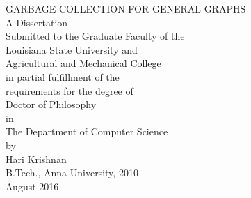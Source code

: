 \documentclass[12pt,letterpaper]{report}
\begin{document}

\thispagestyle{empty}
	\begin{center}
	\vspace*{0.5in}
	\Large{GARBAGE COLLECTION FOR GENERAL GRAPHS}\\
	\vspace{2in}
	\normalsize{A Dissertation\\}
	\vspace{\baselineskip}
	\normalsize{Submitted to the Graduate Faculty of the\\}
        \normalsize{Louisiana State University and\\}
        \normalsize{Agricultural and Mechanical College\\}
	\normalsize{in partial fulfillment of the\\}
        \normalsize{requirements for the degree of\\}
        \normalsize{Doctor of Philosophy\\}
        \vspace{\baselineskip}        
	\normalsize{in\\}
        \vspace{\baselineskip}
	\normalsize{The Department of Computer Science \\}
	\vspace{.5in}
	\normalsize{by\\}
	\normalsize{Hari Krishnan\\}
        \normalsize{B.Tech., Anna University, 2010\\}
	\normalsize{August 2016\\}
	\end{center}

\pagebreak
\end{document}

